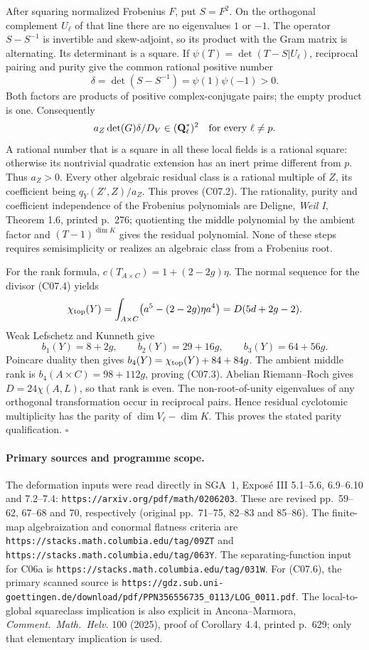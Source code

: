 \documentclass[11pt]{article}
\theoremstyle{remark}\newtheorem{remark}[theorem]{Remark}
\begin{document}
After squaring normalized Frobenius $F$, put $S=F^2$.
On the orthogonal complement $U_\ell$ of that line
there are no eigenvalues $1$ or $-1$.
The operator $S-S^{-1}$ is invertible and skew-adjoint,
so its product with the Gram matrix is alternating.
Its determinant is a square. If
$\psi(T)=\det(T-S|U_\ell)$, reciprocal pairing and purity
give the common rational positive number
\[
              \delta=\det(S-S^{-1})=\psi(1)\psi(-1)>0.
 \]
Both factors are products of positive complex-conjugate
pairs; the empty product is one. Consequently
\[
                  a_Z\det(G)\delta/D_V
                           \in(\mathbf Q_\ell^*)^2
                  \quad\hbox{for every }\ell\ne p.
 \]
A rational number that is a square in all these local
fields is a rational square: otherwise its nontrivial
quadratic extension has an inert prime different from
$p$. Thus $a_Z>0$. Every other algebraic residual class
is a rational multiple of $Z$, its coefficient being
$q_Y(Z',Z)/a_Z$. This proves (C07.2).
The rationality, purity and coefficient independence
of the Frobenius polynomials are Deligne, \emph{Weil I},
Theorem 1.6, printed p.~276; quotienting the middle
polynomial by the ambient factor and $(T-1)^{\dim K}$
gives the residual polynomial. None of these steps
requires semisimplicity or realizes an algebraic class
from a Frobenius root.

For the rank formula, $c(T_{A\times C})=1+(2-2g)\eta$.
The normal sequence for the divisor (C07.4) yields
\[
 \chi_{\rm top}(Y)
     =\int_{A\times C}\bigl(a^5-(2-2g)\eta a^4\bigr)
     =D(5d+2g-2).
 \]
Weak Lefschetz and Kunneth give
\[
 b_1(Y)=8+2g,\qquad b_2(Y)=29+16g,\qquad b_3(Y)=64+56g.
 \]
Poincare duality then gives
$b_4(Y)=\chi_{\rm top}(Y)+84+84g$.
The ambient middle rank is
$b_4(A\times C)=98+112g$, proving (C07.3).
Abelian Riemann--Roch gives $D=24\chi(A,L)$, so that
rank is even. The non-root-of-unity eigenvalues of any
orthogonal transformation occur in reciprocal pairs.
Hence residual cyclotomic multiplicity has the parity
of $\dim V_\ell-\dim K$. This proves the stated parity
qualification. \hfill$\square$

\paragraph{Primary sources and programme scope.}
The deformation inputs were read directly in SGA~1,
Expos\'e III 5.1--5.6, 6.9--6.10 and 7.2--7.4:
\texttt{https://arxiv.org/pdf/math/0206203}.
These are revised pp.~59--62, 67--68 and 70,
respectively (original pp.~71--75, 82--83 and 85--86).
The finite-map algebraization and conormal flatness
criteria are
\texttt{https://stacks.math.columbia.edu/tag/09ZT}
and \texttt{https://stacks.math.columbia.edu/tag/063Y}.
The separating-function input for C06a is
\texttt{https://stacks.math.columbia.edu/tag/031W}.
For (C07.6), the primary scanned source is
\texttt{https://gdz.sub.uni-goettingen.de/download/pdf/PPN356556735\_0113/LOG\_0011.pdf}.
The local-to-global squareclass implication is also
explicit in Ancona--Marmora, \emph{Comment.\ Math.\ Helv.}
100 (2025), proof of Corollary 4.4, printed p.~629;
only that elementary implication is used.
\end{document}
